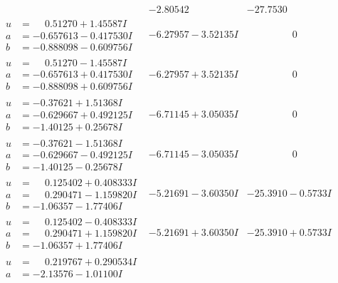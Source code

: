 \documentclass[1p]{elsarticle_modified}
\theoremstyle{definition}
\begin{document}
$$\begin{array}{c|c|c}
 & -2.80542\phantom{ +0.000000I} & -27.7530\phantom{ +0.000000I} \\ \hline\begin{aligned}
u &= \phantom{-}0.51270 + 1.45587 I \\
a &= -0.657613 - 0.417530 I \\
b &= -0.888098 - 0.609756 I\end{aligned}
 & -6.27957 - 3.52135 I & \phantom{-0.000000 } 0 \\ \hline\begin{aligned}
u &= \phantom{-}0.51270 - 1.45587 I \\
a &= -0.657613 + 0.417530 I \\
b &= -0.888098 + 0.609756 I\end{aligned}
 & -6.27957 + 3.52135 I & \phantom{-0.000000 } 0 \\ \hline\begin{aligned}
u &= -0.37621 + 1.51368 I \\
a &= -0.629667 + 0.492125 I \\
b &= -1.40125 + 0.25678 I\end{aligned}
 & -6.71145 + 3.05035 I & \phantom{-0.000000 } 0 \\ \hline\begin{aligned}
u &= -0.37621 - 1.51368 I \\
a &= -0.629667 - 0.492125 I \\
b &= -1.40125 - 0.25678 I\end{aligned}
 & -6.71145 - 3.05035 I & \phantom{-0.000000 } 0 \\ \hline\begin{aligned}
u &= \phantom{-}0.125402 + 0.408333 I \\
a &= \phantom{-}0.290471 - 1.159820 I \\
b &= -1.06357 - 1.77406 I\end{aligned}
 & -5.21691 - 3.60350 I & -25.3910 - 0.5733 I \\ \hline\begin{aligned}
u &= \phantom{-}0.125402 - 0.408333 I \\
a &= \phantom{-}0.290471 + 1.159820 I \\
b &= -1.06357 + 1.77406 I\end{aligned}
 & -5.21691 + 3.60350 I & -25.3910 + 0.5733 I \\ \hline\begin{aligned}
u &= \phantom{-}0.219767 + 0.290534 I \\
a &= -2.13576 - 1.01100 I \\

\end{aligned}
\end{array}$$
\end{document}
